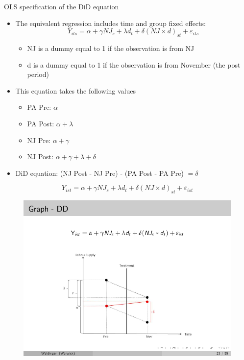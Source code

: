 \documentclass{beamer}
\begin{document}
\begin{frame}{OLS specification of the DiD equation}
	
	\begin{itemize}
	\item The equivalent regression includes time and group fixed effects:$$Y_{its} = \alpha + \gamma NJ_s + \lambda d_t + \delta (NJ \times d)_{st} + \varepsilon_{its}$$
		\begin{itemize}
		\item NJ is a dummy equal to 1 if the observation is from NJ
		\item d is a dummy equal to 1 if the observation is from November (the post period)
		\end{itemize}
	\item This equation takes the following values
		\begin{itemize}
		\item PA Pre: $\alpha$
		\item PA Post: $\alpha + \lambda$
		\item NJ Pre: $\alpha + \gamma$
		\item NJ Post: $\alpha + \gamma + \lambda + \delta$
		\end{itemize}
	\item DiD equation: (NJ Post - NJ Pre) - (PA Post - PA Pre) $= \delta$
	\end{itemize}
\end{frame}




\begin{frame}[plain]
	$$Y_{ist} = \alpha + \gamma NJ_s + \lambda d_t + \delta(NJ\times d)_{st} + \varepsilon_{ist}$$
	\begin{figure}
	\includegraphics[scale=0.90]{./lecture_includes/waldinger_dd_5.pdf}
	\end{figure}
\end{frame}
\end{document}
